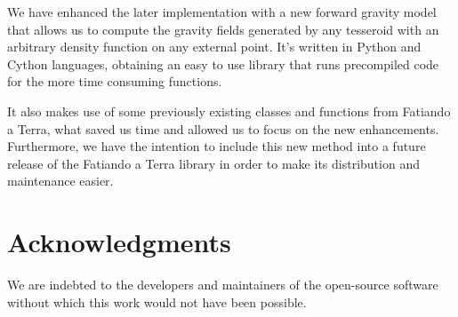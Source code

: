 \documentclass[extra]{gji}
\begin{document}
We have enhanced the later implementation with a new forward gravity model that allows us to compute the gravity fields generated by any tesseroid with an arbitrary density function on any external point.
It's written in Python and Cython languages, obtaining an easy to use library that runs precompiled code for the more time consuming functions.

It also makes use of some previously existing classes and functions from Fatiando a Terra, what saved us time and allowed us to focus on the new enhancements. Furthermore, we have the intention to include this new method into a future release of the Fatiando a Terra library in order to make its distribution and maintenance easier.




\section{Acknowledgments}

We are indebted to the developers and maintainers of the open-source
software without which this work would not have been possible.




\end{document}
